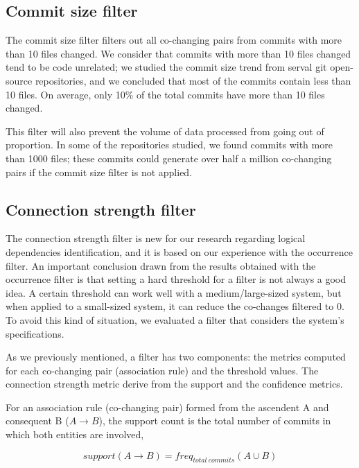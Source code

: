 \documentclass[runningheads]{comsis2}
\begin{document}
\subsection{Commit size filter}
\label{commit_filter}

The commit size filter filters out all co-changing pairs from commits with more than 10 files changed. We consider that commits with more than 10 files changed tend to be code unrelated; we studied the commit size trend from serval git open-source repositories, and we concluded that most of the commits contain less than 10 files. On average, only 10\% of the total commits have more than 10 files changed. 

This filter will also prevent the volume of data processed from going out of proportion. In some of the repositories studied, we found commits with more than 1000 files; these commits could generate over half a million co-changing pairs if the commit size filter is not applied. 



\subsection{Connection strength filter}
\label{strength_filter}


The connection strength filter is new for our research regarding logical dependencies identification, and it is based on our experience with the occurrence filter.
An important conclusion drawn from the results obtained with the occurrence filter is that setting a hard threshold for a filter is not always a good idea. A certain threshold can work well with a medium/large-sized system, but when applied to a small-sized system, it can reduce the co-changes filtered to 0. To avoid this kind of situation, we evaluated a filter that considers the system's specifications. 


As we previously mentioned, a filter has two components: the metrics computed for each co-changing pair (association rule) and the threshold values. The connection strength metric derive from the support and the confidence metrics.

For an association rule (co-changing pair) formed from the ascendent A and consequent B ($A \rightarrow B$), 
the support count is the total number of commits in which both entities are involved,


\begin{equation}
support (A \rightarrow B) = freq_{total\ commits} {(A \cup B)}
\end{equation}
\end{document}
